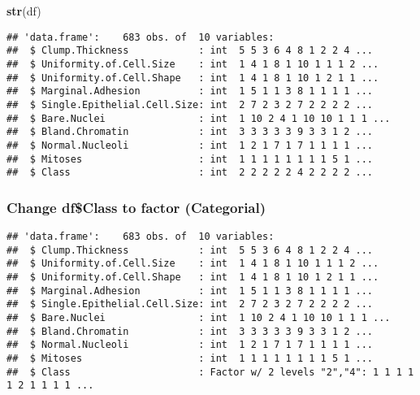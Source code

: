 \documentclass[
]{article}
\newenvironment{Shaded}{\begin{snugshade}}{\end{snugshade}}
\newcommand{\FunctionTok}[1]{\textcolor[rgb]{0.13,0.29,0.53}{\textbf{#1}}}
\newcommand{\NormalTok}[1]{#1}
\newcommand{\OtherTok}[1]{\textcolor[rgb]{0.56,0.35,0.01}{#1}}
\newcommand{\SpecialCharTok}[1]{\textcolor[rgb]{0.81,0.36,0.00}{\textbf{#1}}}
\begin{document}
\begin{Shaded}
\begin{Highlighting}[]
\FunctionTok{str}\NormalTok{(df)}
\end{Highlighting}
\end{Shaded}

\begin{verbatim}
## 'data.frame':    683 obs. of  10 variables:
##  $ Clump.Thickness            : int  5 5 3 6 4 8 1 2 2 4 ...
##  $ Uniformity.of.Cell.Size    : int  1 4 1 8 1 10 1 1 1 2 ...
##  $ Uniformity.of.Cell.Shape   : int  1 4 1 8 1 10 1 2 1 1 ...
##  $ Marginal.Adhesion          : int  1 5 1 1 3 8 1 1 1 1 ...
##  $ Single.Epithelial.Cell.Size: int  2 7 2 3 2 7 2 2 2 2 ...
##  $ Bare.Nuclei                : int  1 10 2 4 1 10 10 1 1 1 ...
##  $ Bland.Chromatin            : int  3 3 3 3 3 9 3 3 1 2 ...
##  $ Normal.Nucleoli            : int  1 2 1 7 1 7 1 1 1 1 ...
##  $ Mitoses                    : int  1 1 1 1 1 1 1 1 5 1 ...
##  $ Class                      : int  2 2 2 2 2 4 2 2 2 2 ...
\end{verbatim}

\subsubsection{Change df\$Class to factor
(Categorial)}\label{change-dfclass-to-factor-categorial}

\begin{Shaded}
\end{Shaded}

\begin{verbatim}
## 'data.frame':    683 obs. of  10 variables:
##  $ Clump.Thickness            : int  5 5 3 6 4 8 1 2 2 4 ...
##  $ Uniformity.of.Cell.Size    : int  1 4 1 8 1 10 1 1 1 2 ...
##  $ Uniformity.of.Cell.Shape   : int  1 4 1 8 1 10 1 2 1 1 ...
##  $ Marginal.Adhesion          : int  1 5 1 1 3 8 1 1 1 1 ...
##  $ Single.Epithelial.Cell.Size: int  2 7 2 3 2 7 2 2 2 2 ...
##  $ Bare.Nuclei                : int  1 10 2 4 1 10 10 1 1 1 ...
##  $ Bland.Chromatin            : int  3 3 3 3 3 9 3 3 1 2 ...
##  $ Normal.Nucleoli            : int  1 2 1 7 1 7 1 1 1 1 ...
##  $ Mitoses                    : int  1 1 1 1 1 1 1 1 5 1 ...
##  $ Class                      : Factor w/ 2 levels "2","4": 1 1 1 1 1 2 1 1 1 1 ...
\end{verbatim}
\end{document}
